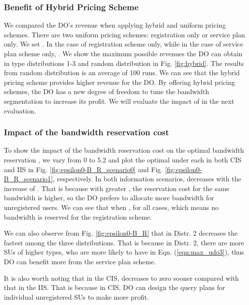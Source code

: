 \documentclass[journal]{IEEEtran}
\begin{document}
\subsubsection{Benefit of Hybrid Pricing Scheme}

We compared the DO's revenue when applying hybrid and uniform pricing schemes. There are two uniform pricing schemes: registration only or service plan only. We set . In the case of registration scheme only,  while in the case of service plan scheme only, . We show the maximum possible revenues the DO can obtain in type distributions 1-3 and random distribution in Fig. \ref{fig:hybrid}. The results from random distribution is an average of 100 runs. We can see that the hybrid pricing scheme provides higher revenue for the DO. By offering hybrid pricing schemes, the DO has a new degree of freedom to tune the bandwidth segmentation to increase its profit. We will evaluate the impact of  in the next evaluation.

\subsubsection{Impact of the bandwidth reservation cost}

To show the impact of the bandwidth reservation cost on the optimal bandwidth reservation
, we vary  from 0 to 5.2 and plot the optimal  under each  in both CIS and IIS in Fig. \ref{fig:epsilon0-B_R_scenario0} and Fig. \ref{fig:epsilon0-B_R_scenario1}, respectively. In both information scenarios,  decreases with the increase of . That is because with greater , the reservation cost for the same bandwidth is higher, so the DO prefers to allocate more bandwidth for unregistered users. We can see that when ,  for all cases, which means no bandwidth is reserved for the registration scheme.

We can also observe from Fig. \ref{fig:epsilon0-B_R} that in Distr. 2  decreases the fastest among the three distributions. That is because in Distr. 2, there are more SUs of higher types, who are more likely to have  in Eqn. (\ref{eqn:max_udo3}), thus DO can benefit more from the service plan scheme.

It is also worth noting that in the CIS,  decreases to zero sooner compared with that in the IIS. That is because in CIS, DO can design the query plans for individual unregistered SUs to make more profit.
\end{document}
